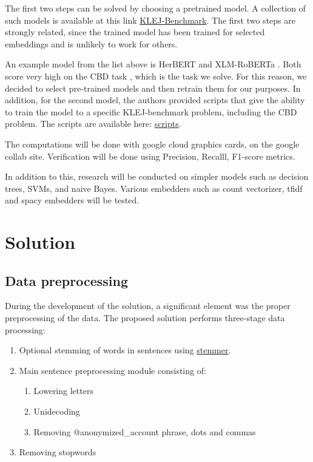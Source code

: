 \documentclass[a4paper]{article}
\begin{document}
The first two steps can be solved by choosing a pretrained model. A collection of such models is available at this link \href{https://klejbenchmark.com/leaderboard/}{KLEJ-Benchmark}.
The first two steps are strongly related, since the trained model has been trained for selected embeddings and is unlikely to work for others.

An example model from the list above is HerBERT \cite{mroczkowski-etal-2021-herbert} and XLM-RoBERTa \cite{dadas2020pretraining}. Both score very high on the CBD task \cite{ptaszynski2019results}, which is the task we solve. For this reason, we decided to select pre-trained models and then retrain them for our purposes.
In addition, for the second model, the authors provided scripts that give the ability to train the model to a specific KLEJ-benchmark problem, including the CBD problem. The scripts are available here: \href{https://github.com/sdadas/polish-roberta}{scripts}.

The computations will be done with google cloud graphics cards, on the google collab site. Verification will be done using Precision, Recalll, F1-score metrics.

In addition to this, research will be conducted on simpler models such as decision trees, SVMs, and naive Bayes. Various embedders such as count vectorizer, tfidf and spacy embedders will be tested. 

\newpage
\section{Solution}

\subsection{Data preprocessing}

During the development of the solution, a significant element was the proper preprocessing of the data. The proposed solution performs three-stage data processing:

\begin{enumerate}
    \item Optional stemming of words in sentences using \href{https://github.com/Tutanchamon/pl_stemmer/blob/master/pl_stemmer.py}{stemmer}.
    \item Main sentence preprocessing module consisting of:
    \begin{enumerate}
        \item Lowering letters
        \item Unidecoding
        \item Removing @anonymized\_account phrase, dots and commas
    \end{enumerate}
    \item Removing stopwords
\end{enumerate}
\end{document}
